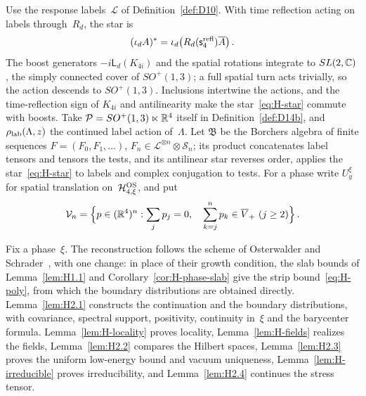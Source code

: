 Use the response labels~$\mathcal L$ of Definition~\ref{def:D10}. With time reflection acting on labels through~$R_d$, the star is
\begin{equation}\label{eq:H-star}
(\iota_dA)^*=\iota_d\bigl(R_d(\mathsf s_4^{\rm refl})\overline A\bigr)\,.
\end{equation}
The boost generators $-i\mathsf L_d(K_{4i})$ and the spatial rotations integrate to $SL(2,\mathbb{C})$, the simply connected cover of $SO^+(1,3)$; a full spatial turn acts trivially, so the action descends to $SO^+(1,3)$. Inclusions intertwine the actions, and the time-reflection sign of $K_{4i}$ and antilinearity make the star~\eqref{eq:H-star} commute with boosts. Take $\mathcal P=SO^+(1,3)\ltimes\mathbb{R}^4$ itself in Definition~\ref{def:D14b}, and $\rho_{\rm lab}(\Lambda,z)$ the continued label action of~$\Lambda$. Let $\mathfrak B$ be the Borchers algebra of finite sequences $F=(F_0,F_1,\ldots)$, $F_n\in\mathcal L^{\otimes n}\otimes\mathcal S_n$; its product concatenates label tensors and tensors the tests, and its antilinear star reverses order, applies the star~\eqref{eq:H-star} to labels and complex conjugation to tests. For a phase write $U_y^\xi$ for spatial translation on~$\mathcal H_{4,\xi}^{\rm OS}$, and put
\begin{equation*}
\mathcal V_n=\Bigl\{p\in(\mathbb{R}^4)^n:\sum_jp_j=0,\quad \sum_{k=j}^np_k\in\overline{V}_+\ (j\ge2)\Bigr\}\,.
\end{equation*}

Fix a phase~$\xi$. The reconstruction follows the scheme of Osterwalder and Schrader~\cite{OsterwalderSchrader1973,OsterwalderSchrader1975}, with one change: in place of their growth condition, the slab bounds of Lemma~\ref{lem:H1.1} and Corollary~\ref{cor:H-phase-slab} give the strip bound~\eqref{eq:H-poly}, from which the boundary distributions are obtained directly. Lemma~\ref{lem:H2.1} constructs the continuation and the boundary distributions, with covariance, spectral support, positivity, continuity in~$\xi$ and the barycenter formula. Lemma~\ref{lem:H-locality} proves locality, Lemma~\ref{lem:H-fields} realizes the fields, Lemma~\ref{lem:H2.2} compares the Hilbert spaces, Lemma~\ref{lem:H2.3} proves the uniform low-energy bound and vacuum uniqueness, Lemma~\ref{lem:H-irreducible} proves irreducibility, and Lemma~\ref{lem:H2.4} continues the stress tensor.

